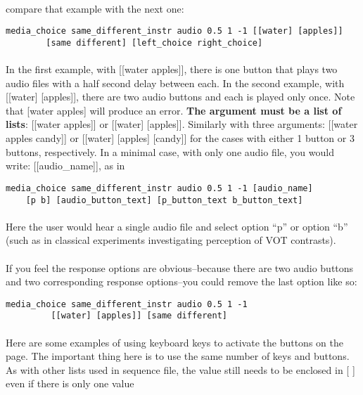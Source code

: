 \paragraph{}
compare that example with the next one:

\begin{lstlisting}
media_choice same_different_instr audio 0.5 1 -1 [[water] [apples]]
		[same different] [left_choice right_choice]
\end{lstlisting}

\paragraph{}
In the first example, with [[water apples]], there is one button that plays two audio files with a half second delay between each.  In the second example, with [[water] [apples]], there are two audio buttons and each is played only once.  Note that [water apples] will produce an error.  \textbf{The argument must be a list of lists}: [[water apples]] or [[water] [apples]].  Similarly with three arguments: [[water apples candy]] or [[water] [apples] [candy]] for the cases with either 1 button or 3 buttons, respectively.  In a minimal case, with only one audio file, you would write: [[audio\_name]], as in 

\begin{lstlisting}
media_choice same_different_instr audio 0.5 1 -1 [audio_name]
	[p b] [audio_button_text] [p_button_text b_button_text]
\end{lstlisting}

\paragraph{}
Here the user would hear a single audio file and select option ``p'' or option ``b'' (such as in classical experiments investigating perception of VOT contrasts).

\paragraph{}
If you feel the response options are obvious--because there are two audio buttons and two corresponding response options--you could remove the last option like so:
\begin{lstlisting}
media_choice same_different_instr audio 0.5 1 -1
		 [[water] [apples]] [same different]
\end{lstlisting}

\paragraph{}
Here are some examples of using keyboard keys to activate the buttons on the page.  The important thing here is to use the same number of keys and buttons.  As with other lists used in sequence file, the value still needs to be enclosed in [ ] even if there is only one value

